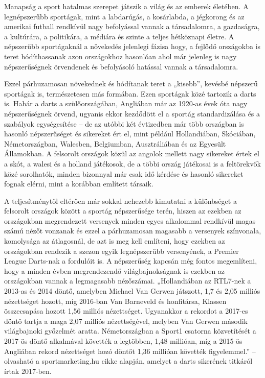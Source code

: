 
Manapság a sport hatalmas szerepet játszik a világ és az emberek életében. A legnépszerűbb 
sportágak, mint a labdarúgás, a kosárlabda, a jégkorong és az amerikai futball rendkívül 
nagy befolyással vannak a társadalomra, a gazdaságra, a kultúrára, a politikára, a médiára és 
szinte a teljes hétköznapi életre. A népszerűbb sportágaknál a növekedés jelenlegi fázisa hogy, a fejlődő országokba is teret hódíthassanak azon országokhoz hasonlóan ahol 
már jelenleg is nagy népszerűségnek örvendenek és befolyásoló hatással vannak a 
társadalomra.

Ezzel párhuzamosan növekednek és hódítanak teret a „kisebb”, kevésbé népszerű sportágak is, természetesen más formában. Ezen sportágak közé tartozik a darts is. Habár a darts a szülőországában, Angliában már az 1920-as évek óta nagy népszerűségnek örvend, ugyanis ekkor 
kezdődött el a sportág standardizálása és a szabályok egységesítése – de az utóbbi két évtizedben már több országban is hasonló népszerűséget és sikereket ért el, mint például Hollandiában, Skóciában, Németországban, Walesben, Belgiumban, 
Ausztráliában és az Egyesült Államokban. A felsorolt országok közül az angolok mellett nagy sikereket értek el a skót, a walesi és a holland játékosok, de a többi ország játékosai is a feltörekvők közé sorolhatók, minden bizonnyal már csak idő kérdése és hasonló sikereket fognak elérni, mint a korábban említett társaik. 

A teljesítménytől eltérően már sokkal nehezebb kimutatni a különbséget a felsorolt országok között a sportág népszerűsége terén, hiszen az ezekben az országokban megrendezett versenyek minden egyes alkalommal rendkívül magas számú nézőt vonzanak és ezzel a párhuzamosan magasabb a versenyek színvonala, komolysága az átlagosnál, de azt is meg kell említeni, hogy ezekben az országokban rendezik a szezon egyik legnépszerűbb versenyének, a Premier League Darts-nak a fordulóit is. A népszerűség kapcsán még fontos megemlíteni, hogy a minden évben megrendezendő világbajnokságnak is ezekben az országokban vannak a legmagasabb nézőszámai. „Hollandiában az RTL7-nek a 2013-as és 2014 döntő, amelyben Michael Van Gerwen játszott, 1,7 és 2,05 milliós nézettséget hozott, míg 2016-ban Van Barneveld és honfitársa, Klassen összecsapása hozott 1,56 milliós nézettséget. Ugyanakkor a rekordot a 2017-es döntő tartja a maga 2,07 milliós nézettségével, melyben Van Gerwen második világbajnoki 
győzelmét aratta. Németországban a Sport1 csatorna közvetítését a 2017-ös döntő alkalmával követték a legtöbben, 1,48 millióan, míg a 2015-ös Angliában rekord nézettséget hozó döntőt 1,36 millióan követték figyelemmel.” –olvasható a sportmarketing.hu cikke alapján, amelyet a darts sikerének titkáról írtak 2017-ben.
\cite{Darts}


